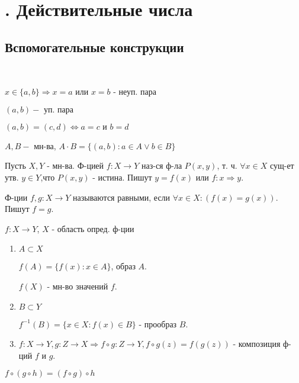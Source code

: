 \section{. Действительные числа}
\subsection{Вспомогательные конструкции}
~\newline

$x \in \{a, b\} \Rightarrow x = a \text{ или } x = b$ - неуп. пара 

$(a, b) - \text{ уп. пара}$

 $(a, b) = (c, d) \iff a = c \text{ и } b = d$

$A, B - \text{ мн-ва}$, $A \cdot B = \{(a, b) \colon a \in A \lor b \in B\}$

\begin{definition}
Пусть $X, Y$ - мн-ва.
Ф-цией $f\colon X \rightarrow Y$ наз-ся ф-ла $P(x, y)$, т. ч. $\forall x \in X$ сущ-ет утв. $y \in Y$,что $P(x, y)$ - истина. Пишут $y = f(x)$ или $f\colon x \Rightarrow y$.
\end{definition}
\begin{definition}
Ф-ции $f, g\colon X \rightarrow Y$ называются равными, если $\forall x \in X \colon (f(x) = g(x))$. Пишут $f = g$.
\end{definition}

\begin{symb}
$f: X \rightarrow Y$, $X$ - область опред. ф-ции

\begin{enumerate}
    \item $A \subset X$ 

    $f(A) = \{f(x) \colon x \in A\}$, образ $A$.

    $f(X)$ - мн-во значений $f$.

    \item $B \subset Y$

    $f^{-1}(B) = \{x \in X \colon f(x) \in B\}$ - прообраз $B$.

    \item $f: X \rightarrow Y, g: Z \rightarrow X \Rightarrow f \circ g: Z \rightarrow Y, f \circ g(z) = f(g(z))$ - композиция ф-ций $f$ и $g$.
\end{enumerate}
\end{symb}

\begin{statement}
$f \circ (g \circ h) = (f \circ g) \circ h$
\end{statement}

